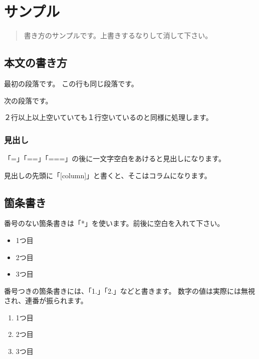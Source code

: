 \chapter{サンプル}
\label{chap:ch01}

\begin{quotation}
書き方のサンプルです。上書きするなりして消して下さい。
\end{quotation}

\section{本文の書き方}
\label{sec:1-1}

最初の段落です。
この行も同じ段落です。

次の段落です。

２行以上以上空いていても１行空いているのと同様に処理します。

\subsection{見出し}
\label{sec:1-1-1}

「=」「==」「===」の後に一文字空白をあけると見出しになります。

\begin{reviewcolumn}
\hypertarget{column:ch01:1}{}

見出しの先頭に「[column]」と書くと、そこはコラムになります。

\end{reviewcolumn}

\section{箇条書き}
\label{sec:1-2}

番号のない箇条書きは「*」を使います。前後に空白を入れて下さい。

\begin{itemize}
\item 1つ目
\item 2つ目
\item 3つ目
\end{itemize}

番号つきの箇条書きには、「1.」「2.」などと書きます。
数字の値は実際には無視され、連番が振られます。

\begin{enumerate}
\item 1つ目
\item 2つ目
\item 3つ目
\end{enumerate}

